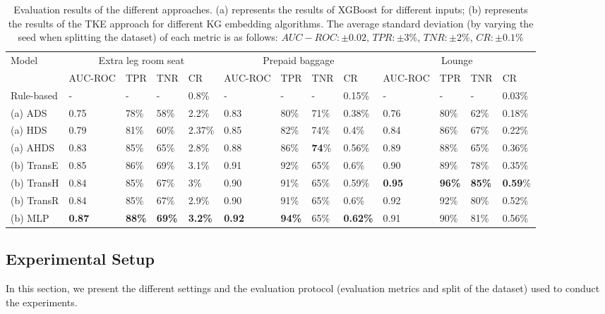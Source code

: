 \documentclass[11pt,dvipdfm]{article}
\begin{document}
\begin{table}[htbp]
  \centering
  \caption{Evaluation results of the different approaches. (a) represents the results of XGBoost for different inputs; (b) represents the results of the TKE approach for different KG embedding algorithms. The average standard deviation (by varying the seed when splitting the dataset) of each metric is as follows: $AUC-ROC: \pm 0.02$, $TPR : \pm 3\%$, $TNR : \pm 2\%$, $CR : \pm 0.1\%$}
  \label{tab:results}
  \begin{tabular}{|p{1.8 cm}|p{0.8 cm}p{0.8 cm}p{0.8 cm}p{0.8 cm}|p{0.8 cm}p{0.8 cm}p{0.8 cm}p{0.8 cm}|p{0.8 cm}p{0.8 cm}p{0.8 cm}p{0.8cm}|}
    \hline
    \multirow{2}{*}{Model} & \multicolumn{4}{c|}{Extra leg room seat} &  \multicolumn{4}{c|}{Prepaid baggage} & \multicolumn{4}{c|}{Lounge} \\
     & AUC-ROC & TPR & TNR & CR & AUC-ROC & TPR & TNR & CR & AUC-ROC & TPR & TNR & CR \\
    \hline
    Rule-based & - & - & - & 0.8\% & - & - & - & 0.15\% & - & - & - & 0.03\% \\
    \hline
    (a) ADS & 0.75 & 78\% & 58\% & 2.2\% & 0.83 & 80\% & 71\% & 0.38\% & 0.76 & 80\% & 62\% & 0.18\% \\
    (a) HDS & 0.79 & 81\% & 60\% & 2.37\% & 0.85 & 82\% & 74\% & 0.4\% & 0.84 & 86\% & 67\% & 0.22\% \\
    (a) AHDS & 0.83 & 85\% & 65\% & 2.8\% & 0.88 & 86\% & \textbf{74}\% & 0.56\% & 0.89 & 88\% & 65\% & 0.36\% \\
    \hline
    (b) TransE & 0.85 & 86\% & 69\% & 3.1\% & 0.91 & 92\% & 65\% & 0.6\% & 0.90 & 89\% & 78\% & 0.35\% \\
    (b) TransH & 0.84 & 85\% & 67\% & 3\% & 0.90 & 91\% & 65\% & 0.59\% & \textbf{0.95} & \textbf{96\%} & \textbf{85\%} & \textbf{0.59}\% \\
    (b) TransR & 0.84 & 85\% & 67\% & 2.9\% & 0.90 & 91\% & 65\% & 0.6\% & 0.92 & 92\% & 80\% & 0.52\% \\
    (b) MLP & \textbf{0.87} & \textbf{88\%} & \textbf{69\%} & \textbf{3.2\%} & \textbf{0.92} & \textbf{94\%} & 65\% & \textbf{0.62\%} & 0.91 & 90\% & 81\% & 0.56\% \\
    \hline
\end{tabular}
\end{table}

\subsection{Experimental Setup}
\label{subsec:exp-setup}
In this section, we present the different settings and the evaluation protocol (evaluation metrics and split of the dataset) used to conduct the experiments.
\end{document}
